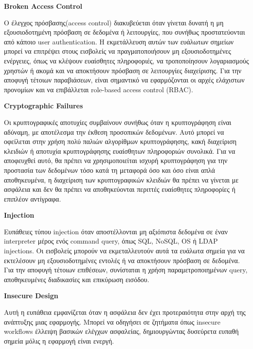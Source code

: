 \begin{center}
    \textbf{\lt Broken Access Control}
\end{center}

Ο έλεγχος πρόσβασης(\lt access control) \gt διακυβεύεται όταν γίνεται δυνατή η μη εξουσιοδοτημένη πρόσβαση σε δεδομένα ή λειτουργίες, που συνήθως προστατεύονται από κάποιο \lt user authentication\gt. Η εκμετάλλευση αυτών των ευάλωτων σημείων μπορεί να επιτρέψει στους εισβολείς να πραγματοποιήσουν μη εξουσιοδοτημένες ενέργειες, όπως να κλέψουν ευαίσθητες πληροφοριές, να τροποποίησουν λογαριασμούς χρηστών ή ακομά και να αποκτήσουν πρόσβαση σε λειτουργίες διαχείρισης. Για την αποφυγή τέτοιων παραβιάσεων, είναι σημαντικό να εφαρμόζονται οι αρχές ελάχιστων προνομίων και να επιβάλλεται \lt role-based access control (RBAC).
\begin{center}
    \textbf{\lt Cryptographic Failures}
\end{center}

Οι κρυπτογραφικές αποτυχίες συμβαίνουν συνήθως όταν η κρυπτογράφηση είναι αδύναμη, με αποτέλεσμα την έκθεση προσοπικών δεδομένων. Αυτό μπορεί να οφείλεται στην χρήση πολύ παλιών αλγορίθμων κρυπτογράφησης, κακή διαχείριση κλειδιών ή αποτυχία κρυπτογράφησης ευαίσθητων πληροφοριών συνολικά. Για να αποφευχθεί αυτό, θα πρέπει να χρησιμοποιείται ισχυρή κρυπτογράφηση για την προστασία των δεδομένων τόσο κατά τη μεταφορά όσο και όσο είναι απλά αποθηκευμένα, η διαχείριση των κρυπτογραφικών κλειδιών θα πρέπει να γίνεται με ασφάλεια και δεν θα πρέπει να αποθηκεύονται περιττές ευαίσθητες πληροφορίες ή επιπλέον αντίγραφα.


\begin{center}
    \textbf{\lt Injection}
\end{center}

Ευπάθειες τύπου \lt injection  όταν αποστέλλονται μη αξιόπιστα δεδομένα σε έναν \lt interpreter  μέρος ενός \lt command  \lt query\gt, όπως \lt SQL, NoSQL, OS ή LDAP injections\gt. Οι εισβολείς μπορούν να εκμεταλλευτούν αυτά τα ευάλωτα σημεία για να εκτελέσουν μη εξουσιοδοτημένες εντολές ή να αποκτήσουν πρόσβαση σε δεδομένα. Για την αποφυγή τέτοιων επιθέσεων, συνίσταται η χρήση παραμετροποιημένων \lt query\gt, αποθηκευμένες διαδικασίες και επικύρωση εισόδου.
\newpage
\begin{center}
    \textbf{\lt Insecure Design}
\end{center}

Αυτή η ευπάθεια εμφανίζεται όταν η ασφάλεια δεν έχει προτεραιότητα στην αρχή της ανάπτυξης μιας εφαρμογής. Μπορεί να οδηγήσει σε ζητήματα όπως \lt insecure workflows  έλλειψη βασικών ελέγχων ασφαλείας, δημιουργώντας δυσεύρετα ευπαθή σημεία μόλις η εφαρμογή είναι ενεργή.

